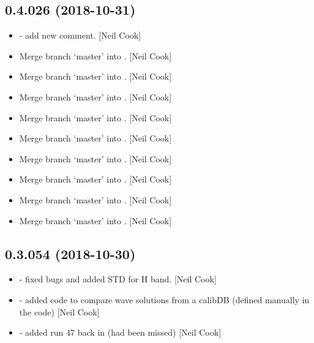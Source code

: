 \documentclass[a4paper,10pt,english]{report}
\begin{document}
\subsection{0.4.026 (2018-10-31)}
\label{\detokenize{misc/changelog:id275}}\begin{itemize}
\item {} 
 - add new comment. {[}Neil Cook{]}

\item {} 
Merge branch ‘master’ into . {[}Neil Cook{]}

\item {} 
Merge branch ‘master’ into . {[}Neil Cook{]}

\item {} 
Merge branch ‘master’ into . {[}Neil Cook{]}

\item {} 
Merge branch ‘master’ into . {[}Neil Cook{]}

\item {} 
Merge branch ‘master’ into . {[}Neil Cook{]}

\item {} 
Merge branch ‘master’ into . {[}Neil Cook{]}

\item {} 
Merge branch ‘master’ into . {[}Neil Cook{]}

\item {} 
Merge branch ‘master’ into . {[}Neil Cook{]}

\item {} 
Merge branch ‘master’ into . {[}Neil Cook{]}

\end{itemize}


\subsection{0.3.054 (2018-10-30)}
\label{\detokenize{misc/changelog:id276}}\begin{itemize}
\item {} 
 - fixed bugs and added STD for H band. {[}Neil Cook{]}

\item {} 
 - added code to compare wave solutions from a calibDB
(defined manually in the code) {[}Neil Cook{]}

\item {} 
 - added run 47 back in (had been missed) {[}Neil Cook{]}

\end{itemize}
\end{document}
